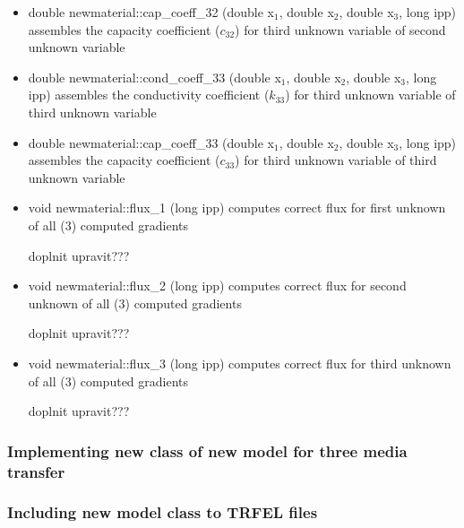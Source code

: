 \begin{itemize}
\item{
{\sf double newmaterial::cap\_coeff\_32 (double x$_1$, double x$_2$, double x$_3$, long ipp)}
\newline assembles the capacity coefficient ($c_{32}$) for third unknown variable of second unknown variable
}

\item{
{\sf double newmaterial::cond\_coeff\_33 (double x$_1$, double x$_2$, double x$_3$, long ipp)}
\newline assembles the conductivity coefficient ($k_{33}$) for third unknown variable of third unknown variable
}

\item{
{\sf double newmaterial::cap\_coeff\_33 (double x$_1$, double x$_2$, double x$_3$, long ipp)}
\newline assembles the capacity coefficient ($c_{33}$) for third unknown variable of third unknown variable
}




\item{
{\sf void newmaterial::flux\_1 (long ipp)}
\newline computes correct flux for first unknown of all (3) computed gradients
}

doplnit upravit???


\item{
{\sf void newmaterial::flux\_2 (long ipp)}
\newline computes correct flux for second unknown of all (3) computed gradients
}

doplnit upravit???


\item{
{\sf void newmaterial::flux\_3 (long ipp)}
\newline computes correct flux for third unknown of all (3) computed gradients
}

doplnit upravit???


\end{itemize}

\subsubsection {Implementing new class of new model for three media transfer}

\subsubsection {Including new model class to TRFEL files}

